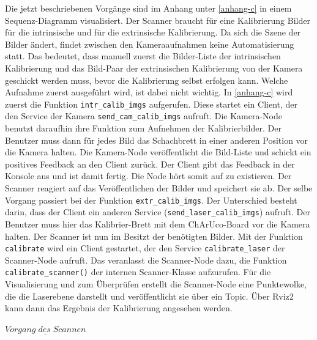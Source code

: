 		Die jetzt beschriebenen Vorgänge sind im Anhang unter \ref{anhang-c} in einem Sequenz-Diagramm visualisiert. \newline
		Der Scanner braucht für eine Kalibrierung Bilder für die intrinsische und für die extrinsische Kalibrierung. Da sich die Szene der Bilder ändert, findet zwischen den Kameraaufnahmen keine Automatisierung statt. Das bedeutet, dass manuell zuerst die Bilder-Liste der intrinsischen Kalibrierung und das Bild-Paar der extrinsischen Kalibrierung von der Kamera geschickt werden muss, bevor die Kalibrierung selbst erfolgen kann. Welche Aufnahme zuerst ausgeführt wird, ist dabei nicht wichtig. In \ref{anhang-c} wird zuerst die Funktion \verb|intr_calib_imgs| aufgerufen. Diese startet ein Client, der den Service der Kamera \verb|send_cam_calib_imgs| aufruft. Die Kamera-Node benutzt daraufhin ihre Funktion zum Aufnehmen der Kalibrierbilder. Der Benutzer muss dann für jedes Bild das Schachbrett in einer anderen Position vor die Kamera halten. Die Kamera-Node veröffentlicht die Bild-Liste und schickt ein positives Feedback an den Client zurück. Der Client gibt das Feedback in der Konsole aus und ist damit fertig. Die Node hört somit auf zu existieren. Der Scanner reagiert auf das Veröffentlichen der Bilder und speichert sie ab. \newline
		Der selbe Vorgang passiert bei der Funktion \verb|extr_calib_imgs|. Der Unterschied besteht darin, dass der Client ein anderen Service (\verb|send_laser_calib_imgs|) aufruft. Der Benutzer muss hier das Kalibrier-Brett mit dem ChArUco-Board vor die Kamera halten. \newline
		Der Scanner ist nun im Besitzt der benötigten Bilder. Mit der Funktion \verb|calibrate| wird ein Client gestartet, der den Service \verb|calibrate_laser| der Scanner-Node aufruft. Das veranlasst die Scanner-Node dazu, die Funktion \verb|calibrate_scanner()| der internen Scanner-Klasse aufzurufen. Für die Visualisierung und zum Überprüfen erstellt die Scanner-Node eine Punktewolke, die die Laserebene darstellt und veröffentlicht sie über ein Topic. Über Rviz2 kann dann das Ergebnis der Kalibrierung angesehen werden.
		
		$\underline{Vorgang\;des\;Scannen}$
		
